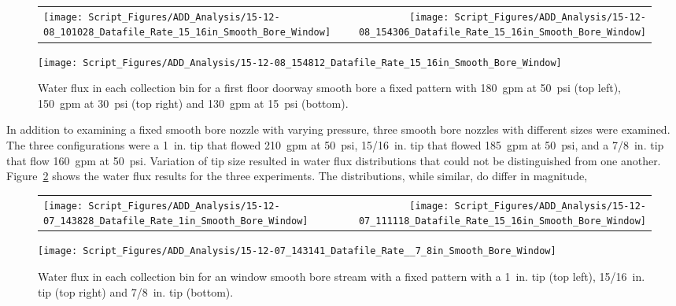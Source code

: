 \documentclass[12pt,oneside]{book}
\begin{document}
\begin{figure}[ht]
\begin{tabular*}{\textwidth}{lr}
\texttt{[image: Script\_Figures/ADD\_Analysis/15-12-08\_101028\_Datafile\_Rate\_15\_16in\_Smooth\_Bore\_Window]} &
\texttt{[image: Script\_Figures/ADD\_Analysis/15-12-08\_154306\_Datafile\_Rate\_15\_16in\_Smooth\_Bore\_Window]} \\
\end{tabular*}
\centering
\texttt{[image: Script\_Figures/ADD\_Analysis/15-12-08\_154812\_Datafile\_Rate\_15\_16in\_Smooth\_Bore\_Window]}
\caption[Water Flux Varying Pressure with Smooth Bore Stream]{Water flux in each collection bin for a first floor doorway smooth bore a fixed pattern with 180~gpm at 50~psi (top left), 150~gpm at 30~psi (top right) and 130~gpm at 15~psi (bottom).}
\label{fig:Window_First_Floor_Varying_Nozzle_Pressure_SB_Fixed_Pattern}
\end{figure}

\clearpage

In addition to examining a fixed smooth bore nozzle with varying pressure, three smooth bore nozzles with different sizes were examined. The three configurations were a 1~in. tip that flowed 210~gpm at 50~psi, 15/16~in. tip that flowed 185~gpm at 50~psi, and a 7/8~in. tip that flow 160~gpm at 50~psi. Variation of tip size resulted in water flux distributions that could not be distinguished from one another. Figure~\ref{fig:Window_Second_Floor_Varying_Flow_Rates_SB_Fixed_Pattern} shows the water flux results for the three experiments. The distributions, while similar, do differ in magnitude,

\begin{figure}[ht]
\begin{tabular*}{\textwidth}{lr}
\texttt{[image: Script\_Figures/ADD\_Analysis/15-12-07\_143828\_Datafile\_Rate\_1in\_Smooth\_Bore\_Window]} &
\texttt{[image: Script\_Figures/ADD\_Analysis/15-12-07\_111118\_Datafile\_Rate\_15\_16in\_Smooth\_Bore\_Window]} \\
\end{tabular*}
\centering
\texttt{[image: Script\_Figures/ADD\_Analysis/15-12-07\_143141\_Datafile\_Rate\_\_7\_8in\_Smooth\_Bore\_Window]}
\caption[Water Flux Varying Tip Size for Smooth Bore Nozzle]{Water flux in each collection bin for an window smooth bore stream with a fixed pattern with a 1~in. tip (top left), 15/16~in. tip (top right) and 7/8~in. tip (bottom).}
\label{fig:Window_Second_Floor_Varying_Flow_Rates_SB_Fixed_Pattern}
\end{figure}
\end{document}
